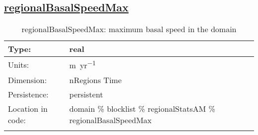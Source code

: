 \subsection[regionalBasalSpeedMax]{\hyperref[sec:var_tab_regionalStatsAM]{regionalBasalSpeedMax}}
\label{subsec:var_sec_regionalStatsAM_regionalBasalSpeedMax}
\begin{center}
\begin{longtable}{| p{2.0in} | p{4.0in} |}
        \hline 
        Type: & real \\
        \hline 
        Units: & \si{m.yr^{-1}} \\
        \hline 
        Dimension: & nRegions Time \\
        \hline 
        Persistence: & persistent \\
        \hline 
         Location in code: & domain \% blocklist \% regionalStatsAM \% regionalBasalSpeedMax \\
         \hline 
    \caption{regionalBasalSpeedMax: maximum basal speed in the domain}
\end{longtable}
\end{center}
